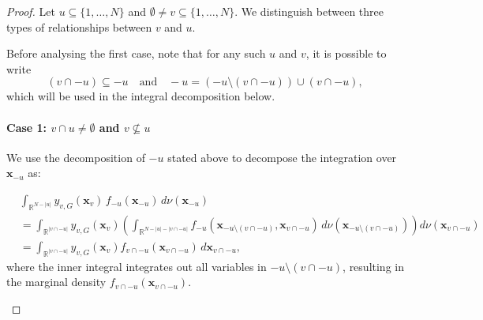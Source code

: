 \begin{proof}
Let $u \subseteq \{1,\dots,N\}$ and $\emptyset \ne v \subseteq \{1,\dots,N\}$. We distinguish between three types of relationships between $v$ and $u$.

Before analysing the first case, note that for any such $u$ and $v$, it is possible to write
\[
(v \cap -u) \subseteq -u \quad \text{and} \quad -u = (-u \setminus (v \cap -u)) \cup (v \cap -u),
\]
which will be used in the integral decomposition below.

\paragraph{Case 1: \( v \cap u \ne \emptyset \) and \( v \not\subseteq u \)}
We use the decomposition of $-u$ stated above to decompose the integration over $\boldsymbol{x}_{-u}$ as:

\begin{equation}
\begin{aligned}
&\int_{\mathbb{R}^{N - |u|}} 
    y_{v,G}(\boldsymbol{x}_v)\,
    f_{-u}(\boldsymbol{x}_{-u}) 
    \, d \nu(\boldsymbol{x}_{-u}) \\[0.5em]
&= \int_{\mathbb{R}^{|v \cap -u|}} 
    y_{v,G}(\boldsymbol{x}_v)
    \left(
        \int_{\mathbb{R}^{N - |u| - |v \cap -u|}}
            f_{-u}(\boldsymbol{x}_{-u \setminus (v \cap -u)}, \boldsymbol{x}_{v \cap -u})
            \, d \nu(\boldsymbol{x}_{-u \setminus (v \cap -u)})
    \right) 
    d \nu(\boldsymbol{x}_{v \cap -u}) \\
    &= \int_{\mathbb{R}^{|v \cap -u|}} y_{v,G}(\boldsymbol{x}_v) f_{v \cap -u}(\boldsymbol{x}_{v \cap -u}) \, d\boldsymbol{x}_{v \cap -u},
\end{aligned}
\end{equation}
where the inner integral integrates out all variables in 
$-u \setminus (v \cap -u)$, 
resulting in the marginal density 
$f_{v \cap -u}(\boldsymbol{x}_{v \cap -u})$.

\begin{center}
\end{center}
\end{proof}
